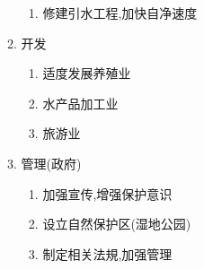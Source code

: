 \documentclass[a4paper]{article}
\begin{document}
\begin{enumerate}
\begin{enumerate}
\begin{enumerate}
                \item 修建引水工程,加快自净速度
            \end{enumerate}
            \item 开发
            \begin{enumerate}
                \item 适度发展养殖业
                \item 水产品加工业
                \item 旅游业
            \end{enumerate}
            \item 管理(政府)
            \begin{enumerate}
                \item 加强宣传,增强保护意识
                \item 设立自然保护区(湿地公园)
                \item 制定相关法規,加强管理
            \end{enumerate}
        \end{enumerate}
    \end{enumerate}
\end{document}

